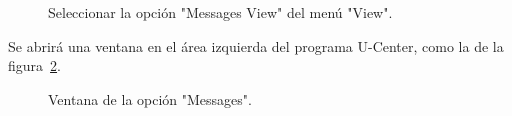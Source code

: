 \begin{figure}[H] %
\caption{Seleccionar la opción "Messages View" del menú "View".}
\label{fig:viewMView}
\end{figure}

Se abrirá una ventana en el área izquierda del programa U-Center, como la de la figura~\ref{fig:Messages}.

\begin{figure}[H] %
\caption{Ventana de la opción "Messages".}
\label{fig:Messages}
\end{figure}

